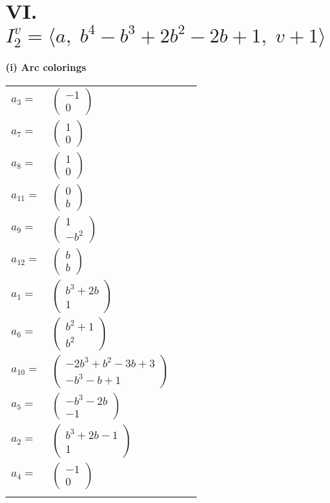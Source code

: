 \documentclass[1p]{elsarticle_modified}
\theoremstyle{definition}
\begin{document}
\centering \section*{VI. $I^v_{2}= \langle a,\;b^4- b^3+2 b^2-2 b+1,\;v+1 \rangle$}
\flushleft \textbf{(i) Arc colorings}\\
\begin{tabular}{m{7pt} m{180pt} m{7pt} m{180pt} }
\flushright $a_{3}=$&$\begin{pmatrix}-1\\0\end{pmatrix}$ \\
\flushright $a_{7}=$&$\begin{pmatrix}1\\0\end{pmatrix}$ \\
\flushright $a_{8}=$&$\begin{pmatrix}1\\0\end{pmatrix}$ \\
\flushright $a_{11}=$&$\begin{pmatrix}0\\b\end{pmatrix}$ \\
\flushright $a_{9}=$&$\begin{pmatrix}1\\- b^2\end{pmatrix}$ \\
\flushright $a_{12}=$&$\begin{pmatrix}b\\b\end{pmatrix}$ \\
\flushright $a_{1}=$&$\begin{pmatrix}b^3+2 b\\1\end{pmatrix}$ \\
\flushright $a_{6}=$&$\begin{pmatrix}b^2+1\\b^2\end{pmatrix}$ \\
\flushright $a_{10}=$&$\begin{pmatrix}-2 b^3+b^2-3 b+3\\- b^3- b+1\end{pmatrix}$ \\
\flushright $a_{5}=$&$\begin{pmatrix}- b^3-2 b\\-1\end{pmatrix}$ \\
\flushright $a_{2}=$&$\begin{pmatrix}b^3+2 b-1\\1\end{pmatrix}$ \\
\flushright $a_{4}=$&$\begin{pmatrix}-1\\0\end{pmatrix}$\\&\end{tabular}
\end{document}
